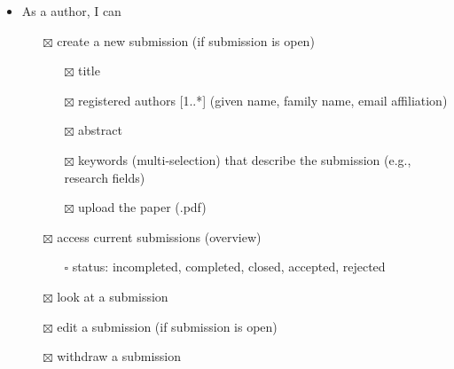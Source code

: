 \documentclass[nochapterpage,nopartpage,noheadingspace,numbersubsubsec,bigchapter,colorback,accentcolor=tud9c,10pt]{tudreport}
\begin{document}
\begin{itemize}
            \item As a author, I can
            \begin{itemize}
                \item[$\boxtimes$] create a new submission (if submission is open)
                \begin{itemize}
                    \item[$\boxtimes$] title
                    \item[$\boxtimes$] registered authors [1..*] (given name, family name, email affiliation)
                    \item[$\boxtimes$] abstract
                    \item[$\boxtimes$] keywords (multi-selection) that describe the submission (e.g., research fields)
                    \item[$\boxtimes$] upload the paper (.pdf)
                \end{itemize}
                \item[$\boxtimes$] access current submissions (overview)
                \begin{itemize}
                    \item[$\square$] status: incompleted, completed, closed, accepted, rejected
                \end{itemize}
                \item[$\boxtimes$] look at a submission
                \item[$\boxtimes$] edit a submission (if submission is open)
                \item[$\boxtimes$] withdraw a submission
            \end{itemize}


\end{itemize}
\end{document}
